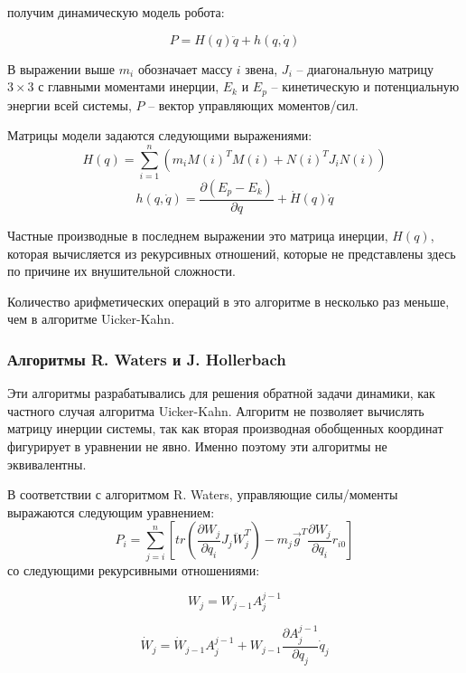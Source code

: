 получим динамическую модель робота:

\begin{equation}
P = H(q) \ddot q + h(q, \dot q)
\end{equation}

В выражении выше $m_i$ обозначает массу $i$ звена, $J_i$ -- диагональную матрицу $3 \times 3$ с главными моментами инерции, $E_k$ и $E_p$ -- кинетическую и потенциальную энергии всей системы, $P$ -- вектор управляющих моментов/сил.

Матрицы модели задаются следующими выражениями:
\begin{equation}
H(q) = \sum_{i=1}^{n}
(
m_i M(i)^T M(i) + N(i)^T J_i N(i)
)
\end{equation}
\begin{equation}
h(q, \dot q) = \frac{\partial (E_p - E_k)}{\partial q} + \dot H(q) \dot q
\end{equation}

Частные производные в последнем выражении это матрица инерции, $H(q)$, которая вычисляется из рекурсивных отношений, которые не представлены здесь по причине их внушительной сложности.

Количество арифметических операций в это алгоритме в несколько раз меньше, чем в алгоритме Uicker-Kahn. 

\subsubsection{Алгоритмы R. Waters и J. Hollerbach}
Эти алгоритмы разрабатывались для решения обратной задачи динамики, как частного случая алгоритма Uicker-Kahn.
Алгоритм не позволяет вычислять матрицу инерции системы, так как вторая производная обобщенных координат фигурирует в уравнении не явно. Именно поэтому эти алгоритмы не эквивалентны.

В соответствии с алгоритмом R. Waters, управляющие силы/моменты выражаются следующим уравнением:
\begin{equation}
\label{eq6}
P_i = 
\sum_{j=i}^{n}
\left[
tr(
\frac{\partial W_j}{\partial q_i} J_j \ddot W_j^T
)
- m_j \vec g^T \frac{\partial W_j}{\partial q_i} r_{i0}
\right]
\end{equation} 
со следующими рекурсивными отношениями:

\begin{equation}
W_j = W_{j-1} A_j^{j-1}
\end{equation}

\begin{equation}
\dot W_j = \dot W_{j-1} A_j^{j-1} + W_{j-1} \frac{\partial A_j^{j-1}}{\partial q_j} \dot q_j
\end{equation}


